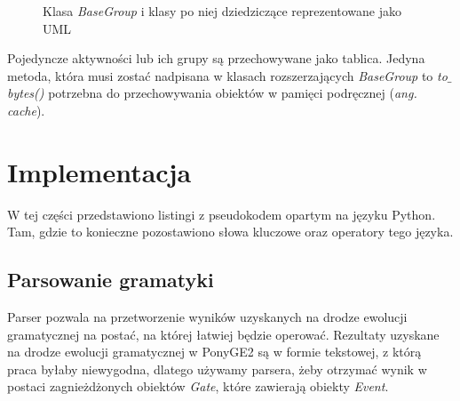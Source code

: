 \begin{figure}[H]
	\caption{\label{fig:EventUML}Klasa \textit{BaseGroup} i klasy po niej dziedziczące reprezentowane jako UML}
\end{figure}

Pojedyncze aktywności lub ich grupy są przechowywane jako tablica. Jedyna metoda, która musi zostać nadpisana w klasach rozszerzających \textit{BaseGroup} to \textit{to$\_$bytes()} potrzebna do przechowywania obiektów w pamięci podręcznej (\textit{ang. cache}). 

\section{Implementacja}

W tej części przedstawiono listingi z pseudokodem opartym na języku Python. Tam, gdzie to konieczne pozostawiono słowa kluczowe oraz operatory tego języka.

\subsection{Parsowanie gramatyki}
Parser pozwala na przetworzenie wyników uzyskanych na drodze ewolucji gramatycznej na postać, na której łatwiej będzie operować. Rezultaty uzyskane na drodze ewolucji gramatycznej w PonyGE2 są w formie tekstowej, z którą praca byłaby niewygodna, dlatego używamy parsera, żeby otrzymać wynik w postaci zagnieżdżonych obiektów \textit{Gate}, które zawierają obiekty \textit{Event}.

